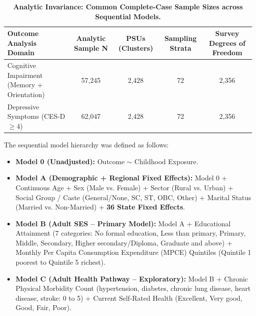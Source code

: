 \begin{table}[!htbp]
\centering
\small
\caption{\textbf{Analytic Invariance: Common Complete-Case Sample Sizes across Sequential Models.}}
\label{tab:common_samples}
\begin{tabular}{lcccc}
\toprule
\textbf{Outcome Analysis Domain} & \textbf{Analytic Sample N} & \textbf{PSUs (Clusters)} & \textbf{Sampling Strata} & \textbf{Survey Degrees of Freedom} \\
\midrule
Cognitive Impairment (Memory + Orientation) & 57,245 & 2,428 & 72 & 2,356 \\
Depressive Symptoms (CES-D $\ge 4$)          & 62,047 & 2,428 & 72 & 2,356 \\
\bottomrule
\end{tabular}
\end{table}

The sequential model hierarchy was defined as follows:
\begin{itemize}
    \item \textbf{Model 0 (Unadjusted):} Outcome $\sim$ Childhood Exposure.
    \item \textbf{Model A (Demographic + Regional Fixed Effects):} Model 0 + Continuous Age + Sex (Male vs. Female) + Sector (Rural vs. Urban) + Social Group / Caste (General/None, SC, ST, OBC, Other) + Marital Status (Married vs. Non-Married) + \textbf{36 State Fixed Effects}.
    \item \textbf{Model B (Adult SES -- Primary Model):} Model A + Educational Attainment (7 categories: No formal education, Less than primary, Primary, Middle, Secondary, Higher secondary/Diploma, Graduate and above) + Monthly Per Capita Consumption Expenditure (MPCE) Quintiles (Quintile 1 poorest to Quintile 5 richest).
    \item \textbf{Model C (Adult Health Pathway -- Exploratory):} Model B + Chronic Physical Morbidity Count (hypertension, diabetes, chronic lung disease, heart disease, stroke: 0 to 5) + Current Self-Rated Health (Excellent, Very good, Good, Fair, Poor).
\end{itemize}
